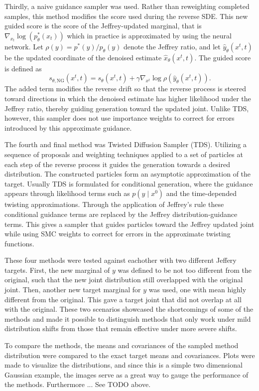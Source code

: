 Thirdly, a naive guidance sampler was used. Rather than reweighting completed samples, this method modifies the score used during the reverse SDE. This new guided score is the score of the Jeffrey-updated marginal, that is $\nabla_{x_t}\log(p_\theta^*(x_t))$ which in practice is approximated by using the neural network. Let
\(\rho(y)=p^*(y)/p_\theta(y)\) denote the Jeffrey ratio, and let
\(\hat y_\theta(x^t,t)\) be the updated coordinate of the denoised estimate
\(\hat x_\theta(x^t,t)\). The guided score is defined as
\begin{equation*}
s_{\theta,\mathrm{NG}}(x^t,t)
=
s_\theta(x^t,t)
+
\gamma \nabla_{x^t}\log \rho(\hat y_\theta(x^t,t)).
\end{equation*}
The added term modifies the reverse drift so that the reverse process is steered toward directions in which the denoised estimate has higher likelihood under the Jeffrey ratio, thereby guiding generation toward the updated joint. Unlike TDS, however, this sampler does not use importance weights to correct for errors introduced by this approximate guidance.

The fourth and final method was Twisted Diffusion Sampler (TDS). Utilizing a sequence of proposals and weighting techniques applied to a set of particles at each step of the reverse process it guides the generation towards a desired distribution. The constructed particles form an asymptotic approximation of the target. Usually TDS is formulated for conditional generation, where the guidance appears through likelihood terms such as $p(y \mid x^0)$ and the time-depended twisting approximations. Through the application of Jeffrey's rule these conditional guidance terms are replaced by the Jeffrey distribution-guidance terms. This gives a sampler that guides particles toward the Jeffrey updated joint while using SMC weights to correct for errors in the approximate twisting functions.

These four methods were tested against eachother with two different Jeffery targets. First, the new marginal of $y$ was defined to be not too different from the original, such that the new joint distribution still overlapped with the original joint. Then, another new target marginal for $y$ was used, one with mean highly different from the original. This gave a target joint that did not overlap at all with the original. These two scenarios showcased the shortcomings of some of the methods and made it possible to distinguish methods that only work under mild distribution shifts from those that remain effective under more severe shifts.

To compare the methods, the means and covariances of the sampled method distribution were compared to the exact target means and covariances. Plots were made to visualize the distributions, and since this is a simple two dimensional Gaussian example, the images serve as a great way to gauge the performance of the methods. Furthermore ... See TODO above.

